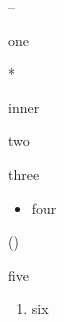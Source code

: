 \documentclass{article}
\begin{document}
\begin{list}{--}{}
\item one
\begin{list}{*}{}
\item inner
\end{list}
\item two
\item[x] three
\begin{itemize}
\item four
\end{itemize}
\end{list}
\begin{list}{()}{}
\item five
\end{list}
\begin{enumerate}
\item six
\end{enumerate}
\end{document}
